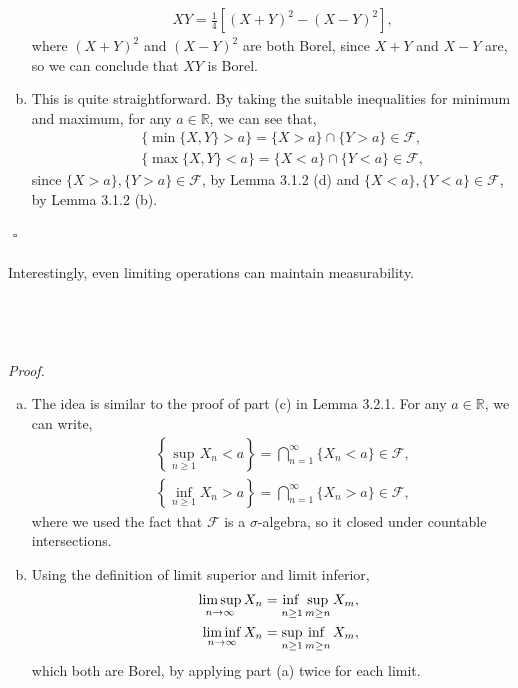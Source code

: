 \documentclass{article}
\begin{document}
\begin{enumerate}[(a)]
	\begin{eqnarray}
	\nonumber
	&& XY = \frac{1}{4}[(X+Y)^2 - (X-Y)^2],
	\end{eqnarray}
	where $(X+Y)^2$ and $(X-Y)^2$ are both Borel, since $X+Y$ and $X-Y$ are, so we can conclude that $XY$ is Borel.
	\item This is quite straightforward. By taking the suitable inequalities for minimum and maximum, for any $a \in \mathbb{R}$, we can see that,
	\begin{eqnarray}
	\nonumber
	&&\{\min\{X,Y\} > a\} = \{X > a\} \cap \{Y > a\} \in \mathcal{F},\\
	\nonumber
	&{}&\{\max\{X,Y\} < a\} = \{X < a\} \cap \{Y < a\} \in \mathcal{F},
	\end{eqnarray}
	since $\{X>a\},\{Y>a\} \in \mathcal{F}$, by Lemma 3.1.2 (d) and $\{X<a\},\{Y<a\} \in \mathcal{F}$, by Lemma 3.1.2 (b).
\end{enumerate}
${}$ \hfill $\square$ \\\\
Interestingly, even limiting operations can maintain measurability.\\\\
\noindent{}\\\\\\
\textit{Proof.}
\begin{enumerate}[(a)]
	\item The idea is similar to the proof of part (c) in Lemma 3.2.1. For any $a \in \mathbb{R}$, we can write,
	\begin{eqnarray}
	\nonumber
	&&\left\{\sup_{n \geq 1}X_n < a\right\} = \bigcap_{n=1}^{\infty}\{X_n < a\} \in \mathcal{F},\\
	\nonumber
	&{}&\left\{\inf_{n \geq 1}X_n > a\right\} = \bigcap_{n=1}^{\infty}\{X_n > a\} \in \mathcal{F},
	\end{eqnarray}
	where we used the fact that $\mathcal{F}$ is a $\sigma$-algebra, so it closed under countable intersections.
	\item Using the definition of limit superior and limit inferior,
	\begin{eqnarray}
	\nonumber
	&&\limsup_{n\to\infty}X_n = \adjustlimits\inf_{n \geq 1} \sup_{m \geq n}X_m,\\
	\nonumber
	&{}&\liminf_{n\to\infty}X_n = \adjustlimits\sup_{n \geq 1} \inf_{m \geq n}X_m,
	\end{eqnarray}
	which both are Borel, by applying part (a) twice for each limit.
\end{enumerate}
\end{document}
